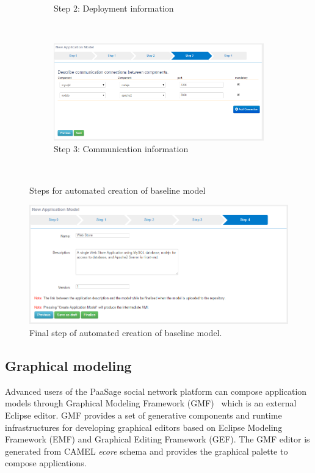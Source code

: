 \begin{figure}
\begin{subfigure}{.8\textwidth}
  \caption{Step 2: Deployment information}
  \label{fig:sfig2}
\end{subfigure} \\[1ex]
\begin{subfigure}{.8\textwidth}
  \centering
  \includegraphics[scale=0.4]{./fig/model_creation3.png}
  \caption{Step 3: Communication information}
  \label{fig:sfig3}
\end{subfigure} \\[1ex]
\caption{Steps for automated creation of baseline model}
\label{fig:model_creation_0}
\end{figure}

\begin{figure}
  \centering
  \includegraphics[scale=0.4]{./fig/model_creation4.png}
  \caption{Final step of automated creation of baseline model.}
  \label{fig:sfig4}
\end{figure}

\clearpage

\subsection{Graphical modeling}
\label{sec:gmf}
Advanced users of the PaaSage social network platform can compose application models through Graphical Modeling Framework (GMF)~\cite{gmf_url} which is an external Eclipse editor. GMF provides a set of generative components and runtime infrastructures for developing graphical editors based on Eclipse Modeling Framework (EMF) and Graphical Editing Framework (GEF). The GMF editor is generated from CAMEL {\em ecore} schema and provides the graphical palette to compose applications. 


